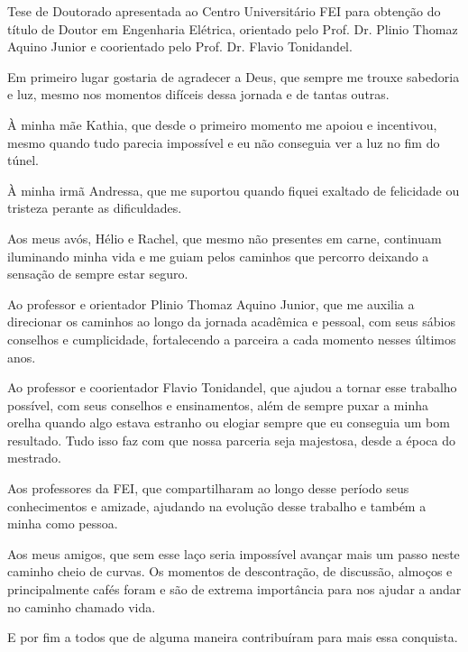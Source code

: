 \maketitle{}

\begin{folhaderosto}
Tese de Doutorado apresentada ao Centro Universitário FEI para obtenção do título de Doutor em Engenharia Elétrica, orientado pelo Prof. Dr. Plinio Thomaz Aquino Junior e coorientado pelo Prof. Dr. Flavio Tonidandel.
\end{folhaderosto}




\begin{agradecimentos}
Em primeiro lugar gostaria de agradecer a Deus, que sempre me trouxe sabedoria e luz, mesmo nos momentos difíceis dessa jornada e de tantas outras.

À minha mãe Kathia, que desde o primeiro momento me apoiou e incentivou, mesmo quando tudo parecia impossível e eu não conseguia ver a luz no fim do túnel.

À minha irmã Andressa, que me suportou quando fiquei exaltado de felicidade ou tristeza perante as dificuldades.

Aos meus avós, Hélio e Rachel, que mesmo não presentes em carne, continuam iluminando minha vida e me guiam pelos caminhos que percorro deixando a sensação de sempre estar seguro.

Ao professor e orientador Plinio Thomaz Aquino Junior, que me auxilia a direcionar os caminhos ao longo da jornada acadêmica e pessoal, com seus sábios conselhos e cumplicidade, fortalecendo a parceira a cada momento nesses últimos anos.

Ao professor e coorientador Flavio Tonidandel, que ajudou a tornar esse trabalho possível, com seus conselhos e ensinamentos, além de sempre puxar a minha orelha quando algo estava estranho ou elogiar sempre que eu conseguia um bom resultado. Tudo isso faz com que nossa parceria seja majestosa, desde a época do mestrado.

Aos professores da FEI, que compartilharam ao longo desse período seus conhecimentos e amizade, ajudando na evolução desse trabalho e também a minha como pessoa.

Aos meus amigos, que sem esse laço seria impossível avançar mais um passo neste caminho cheio de curvas. Os momentos de descontração, de discussão, almoços e principalmente cafés foram e são de extrema importância para nos ajudar a andar no caminho chamado vida.

E por fim a todos que de alguma maneira contribuíram para mais essa conquista.

\end{agradecimentos}

